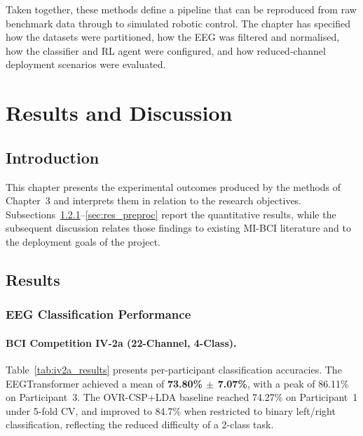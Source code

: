 \documentclass[12pt, a4paper]{article}
\begin{document}
Taken together, these methods define a pipeline that can be reproduced from raw benchmark data through to simulated robotic control. The chapter has specified how the datasets were partitioned, how the EEG was filtered and normalised, how the classifier and RL agent were configured, and how reduced-channel deployment scenarios were evaluated.

\section{Results and Discussion}

\subsection{Introduction}

This chapter presents the experimental outcomes produced by the methods of Chapter~3 and interprets them in relation to the research objectives. Subsections~\ref{sec:res_class}--\ref{sec:res_preproc} report the quantitative results, while the subsequent discussion relates those findings to existing MI-BCI literature and to the deployment goals of the project.

\subsection{Results}

\subsubsection{EEG Classification Performance}
\label{sec:res_class}

\paragraph{BCI Competition IV-2a (22-Channel, 4-Class).}

Table~\ref{tab:iv2a_results} presents per-participant classification accuracies. The EEGTransformer achieved a mean of \textbf{73.80\% $\pm$ 7.07\%}, with a peak of 86.11\% on Participant~3. The OVR-CSP+LDA baseline reached 74.27\% on Participant~1 under 5-fold CV, and improved to 84.7\% when restricted to binary left/right classification, reflecting the reduced difficulty of a 2-class task.
\end{document}
